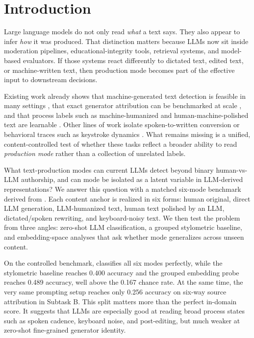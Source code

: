\section{Introduction}
\label{sec:introduction}

Large language models do not only read \emph{what} a text says. They also appear to infer \emph{how} it was produced. That distinction matters because LLMs now sit inside moderation pipelines, educational-integrity tools, retrieval systems, and model-based evaluators. If those systems react differently to dictated text, edited text, or machine-written text, then production mode becomes part of the effective input to downstream decisions.

 Existing work already shows that machine-generated text detection is feasible in many settings \cite{wu2023survey}, that exact generator attribution can be benchmarked at scale \cite{wang2024semeval}, and that process labels such as machine-humanized and human-machine-polished text are learnable \cite{abassy2024llmdetectaive}. Other lines of work isolate spoken-to-written conversion \cite{liu2024recording} or behavioral traces such as keystroke dynamics \cite{kundu2024keystroke}. What remains missing is a unified, content-controlled test of whether these tasks reflect a broader ability to read \emph{production mode} rather than a collection of unrelated labels.

 What text-production modes can current LLMs detect beyond binary human-vs-LLM authorship, and can mode be isolated as a latent variable in LLM-derived representations? We answer this question with a matched six-mode benchmark derived from \hcthree \cite{guo2023hc3}. Each content anchor is realized in six forms: human original, direct LLM generation, LLM-humanized text, human text polished by an LLM, dictated/spoken rewriting, and keyboard-noisy text. We then test the problem from three angles: zero-shot LLM classification, a grouped stylometric baseline, and embedding-space analyses that ask whether mode generalizes across unseen content.

 On the controlled benchmark, \gptfourone classifies all six modes perfectly, while the stylometric baseline reaches 0.400 accuracy and the grouped embedding probe reaches 0.489 accuracy, well above the 0.167 chance rate. At the same time, the very same prompting setup reaches only 0.256 accuracy on six-way source attribution in \semeval Subtask B. This split matters more than the perfect in-domain score. It suggests that LLMs are especially good at reading broad process states such as spoken cadence, keyboard noise, and post-editing, but much weaker at zero-shot fine-grained generator identity.

